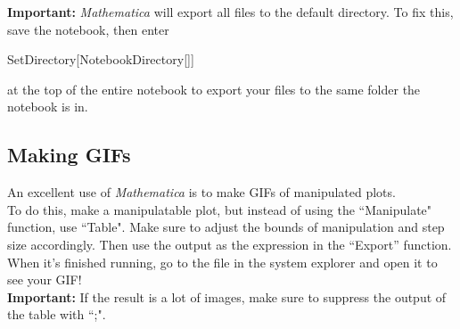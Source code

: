 \documentclass[11pt,a4paper,twoside]{article}
\begin{document}
			\textbf{Important:}  \textit{Mathematica} will export all files to the default directory.  To fix this, save the notebook, then enter
			
			\begin{center}
			
				SetDirectory[NotebookDirectory[]]
			
			\end{center}
			
			at the top of the entire notebook to export your files to the same folder the notebook is in.
			
			\subsection{Making GIFs}
			
				An excellent use of \textit{Mathematica} is to make GIFs of manipulated plots. \\
				
				To do this, make a manipulatable plot, but instead of using the ``Manipulate" function, use ``Table".  Make sure to adjust the bounds of manipulation and step size accordingly.  Then use the output as the expression in the ``Export'' function. \\
				
				When it's finished running, go to the file in the system explorer and open it to see your GIF! \\
				
				\textbf{Important:} If the result is a lot of images, make sure to suppress the output of the table with ``;".
			
%		
%			
%				
%					
%				
%					
%				
%					
%				
%					
%				
%					
%				
%					
%				
%			
			
\end{document}
